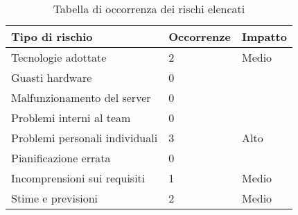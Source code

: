 \begin{table}[H]
	\begin{center}

		\begin{tabular}{| p{5cm} | p{5cm} | p{5cm} |}
			\hline
			\textbf{Tipo di rischio}	& \textbf{Occorrenze} & \textbf{Impatto}\\
			\hline
			Tecnologie adottate	&	2 	&  Medio	\\
			\hline
			Guasti hardware	&	0 	& 	\\
			\hline
			Malfunzionamento del server	&	0 	& 	\\
			\hline
			Problemi interni al team	&	0 	& 	\\
			\hline
			Problemi personali individuali	&	3 	&	Alto \\
			\hline
			Pianificazione errata	&	0 	& 	\\
			\hline
			Incomprensioni sui requisiti	&	1 	&	Medio	\\
			\hline
			Stime e previsioni	&	2 	&  Medio  \\
			\hline
		\end{tabular}
		\vline
		\caption{Tabella di occorrenza dei rischi elencati}
			\vline
	\end{center}
\end{table}

